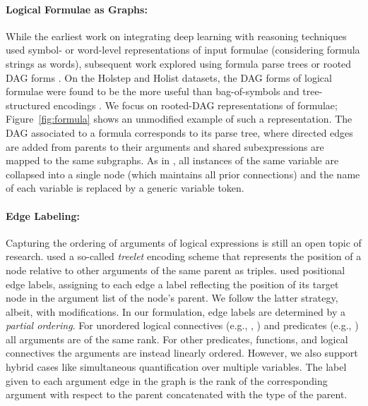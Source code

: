 \documentclass{article}
\begin{document}
\paragraph{Logical Formulae as Graphs:} While the earliest work on integrating deep learning with reasoning techniques used symbol- or word-level representations of input formulae \cite{irving2016deepmath,kaliszyk2017holstep} (considering formula strings as words), subsequent work explored using formula parse trees \cite{loos2017deep,evans2018can,huang2018gamepad} or rooted DAG forms \cite{wang2017premise,paliwal2019graph}. On the Holstep \cite{kaliszyk2017holstep} and Holist \cite{bansal2019holist} datasets, the DAG forms of logical formulae were found to be the more useful than bag-of-symbols and tree-structured encodings \cite{wang2017premise,paliwal2019graph}. We focus on rooted-DAG representations of formulae; Figure~\ref{fig:formula} shows an unmodified example of such a representation. The DAG associated to a formula corresponds to its parse tree, where directed edges are added from parents to their arguments and shared subexpressions are mapped to the same subgraphs. As in \cite{wang2017premise}, all instances of the same variable are collapsed into a single node (which maintains all prior connections) and the name of each variable is replaced by a generic variable token.

\paragraph{Edge Labeling:}
\label{sec:edge_labels}
Capturing the ordering of arguments of logical expressions is still an open topic of research. \cite{wang2017premise} used a so-called \emph{treelet} encoding scheme that represents the position of a node relative to other arguments of the same parent as triples. \cite{paliwal2019graph} used positional edge labels, assigning to each edge a label reflecting the position of its target node in the argument list of the node's parent.
We follow the latter strategy, albeit, with modifications. In our formulation, edge labels are determined by a \textit{partial ordering}. For unordered logical connectives (e.g., , ) and predicates (e.g., ) all arguments are of the same rank. For other predicates, functions, and logical connectives the arguments are instead linearly ordered. However, we also support hybrid cases like simultaneous quantification over multiple variables. 
The label given to each argument edge in the graph is the rank of the corresponding argument with respect to the parent concatenated with the type of the parent.
\end{document}
